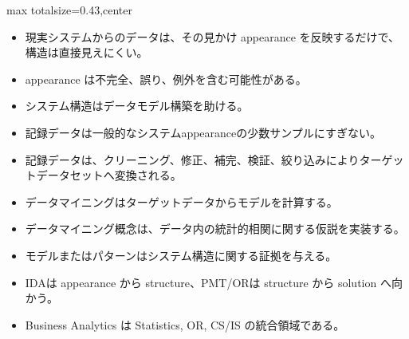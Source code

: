 \clearpage
{}
\begin{minipage}[t]{0.405\textwidth}
\begin{adjustbox}{max totalsize={\textwidth}{0.43\textheight},center}
\begin{minipage}{\textwidth}\scriptsize
{}\begin{itemize}
\item 現実システムからのデータは、その見かけ appearance を反映するだけで、構造は直接見えにくい。
\item appearance は不完全、誤り、例外を含む可能性がある。
\item システム構造はデータモデル構築を助ける。
\item 記録データは一般的なシステムappearanceの少数サンプルにすぎない。
\item 記録データは、クリーニング、修正、補完、検証、絞り込みによりターゲットデータセットへ変換される。
\item データマイニングはターゲットデータからモデルを計算する。
\item データマイニング概念は、データ内の統計的相関に関する仮説を実装する。
\item モデルまたはパターンはシステム構造に関する証拠を与える。
\end{itemize}\begin{itemize}
\item IDAは appearance から structure、PMT/ORは structure から solution へ向かう。
\item Business Analytics は Statistics, OR, CS/IS の統合領域である。
\end{itemize}
\end{minipage}
\end{adjustbox}
\end{minipage}\hfill
